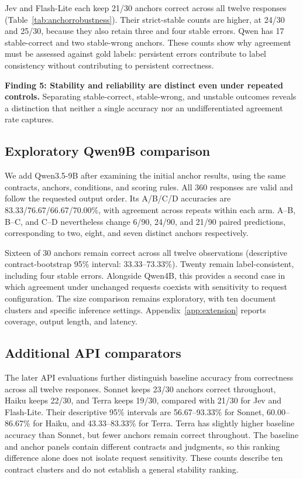 Jev and Flash-Lite each keep 21/30 anchors correct across all twelve responses (Table~\ref{tab:anchorrobustness}). Their strict-stable counts are higher, at 24/30 and 25/30, because they also retain three and four stable errors. Qwen has 17 stable-correct and two stable-wrong anchors. These counts show why agreement must be assessed against gold labels: persistent errors contribute to label consistency without contributing to persistent correctness.

\textbf{Finding 5: Stability and reliability are distinct even under repeated controls.} Separating stable-correct, stable-wrong, and unstable outcomes reveals a distinction that neither a single accuracy nor an undifferentiated agreement rate captures.



\subsection{Exploratory Qwen9B comparison}
\label{sec:qwen9extension}
We add Qwen3.5-9B after examining the initial anchor results, using the same contracts, anchors, conditions, and scoring rules. All 360 responses are valid and follow the requested output order. Its A/B/C/D accuracies are 83.33/76.67/66.67/70.00\%, with agreement across repeats within each arm. A--B, B--C, and C--D nevertheless change 6/90, 24/90, and 21/90 paired predictions, corresponding to two, eight, and seven distinct anchors respectively.

Sixteen of 30 anchors remain correct across all twelve observations (descriptive contract-bootstrap 95\% interval: 33.33--73.33\%). Twenty remain label-consistent, including four stable errors. Alongside Qwen4B, this provides a second case in which agreement under unchanged requests coexists with sensitivity to request configuration. The size comparison remains exploratory, with ten document clusters and specific inference settings. Appendix~\ref{app:extension} reports coverage, output length, and latency.

\subsection{Additional API comparators}
The later API evaluations further distinguish baseline accuracy from correctness across all twelve responses. Sonnet keeps 23/30 anchors correct throughout, Haiku keeps 22/30, and Terra keeps 19/30, compared with 21/30 for Jev and Flash-Lite. Their descriptive 95\% intervals are 56.67--93.33\% for Sonnet, 60.00--86.67\% for Haiku, and 43.33--83.33\% for Terra. Terra has slightly higher baseline accuracy than Sonnet, but fewer anchors remain correct throughout. The baseline and anchor panels contain different contracts and judgments, so this ranking difference alone does not isolate request sensitivity. These counts describe ten contract clusters and do not establish a general stability ranking.

